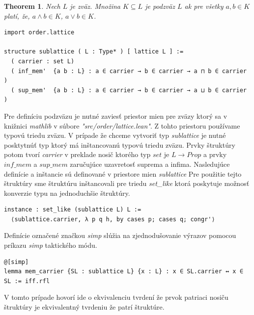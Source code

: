 \documentclass[a4paper,10pt,oneside]{report}%
\newtheorem{theorem}{Theorem}
\begin{document}
\begin{theorem}
    Nech $L$ je zväz. Množina $K \subseteq L$ je \emph{podzväz} $L$ ak pre všetky 
$a,b \in K$ platí, že, $a \wedge b \in K$, $a \vee b \in K$.
\end{theorem}
\begin{lstlisting}
import order.lattice

structure sublattice ( L : Type* ) [ lattice L ] :=
  ( carrier : set L)
  ( inf_mem'  {a b : L} : a ∈ carrier → b ∈ carrier → a ⊓ b ∈ carrier )
  ( sup_mem'  {a b : L} : a ∈ carrier → b ∈ carrier → a ⊔ b ∈ carrier )
\end{lstlisting}
    Pre definíciu podzväzu je nutné zaviesť priestor mien pre zväzy ktorý sa v knižnici
\emph{mathlib} v súbore \emph{"src/order/lattice.lean"}.
    Z tohto priestoru používame typovú triedu zväzu.
    V prípade že chceme vytvoriť typ \emph{sublattice} je nutné posktytnúť
typ ktorý má inštancovanú typovú triedu zväzu.
    Prvky štruktúry potom tvorí \emph{carrier} v preklade nosič ktorého typ
$set$ je $L \to Prop$ a prvky $inf\_mem$ a $sup\_mem$ zaručujúce uzavretosť
    suprema a infima.
    Nasledujúce definície a inštancie sú definované v priestore mien \emph{sublattice}
    Pre použitie tejto štruktúry sme štruktúru inštancovali pre triedu \emph{set\_like}
ktorá poskytuje možnosť konverzie typu na jednoduchšie štruktúry.
\begin{lstlisting}
instance : set_like (sublattice L) L :=
  ⟨sublattice.carrier, λ p q h, by cases p; cases q; congr'⟩
\end{lstlisting}
    Definície označené značkou \emph{simp} slúžia na zjednodušovanie výrazov
pomocou príkazu \emph{simp} taktického módu.
\begin{lstlisting}
@[simp]
lemma mem_carrier {SL : sublattice L} {x : L} : x ∈ SL.carrier ↔ x ∈ SL := iff.rfl
\end{lstlisting}
    V tomto prípade hovorí ide o ekvivalenciu tvrdení že prvok patriaci nosiču
štruktúry je ekvivalentný tvrdeniu že patrí štruktúre.
\end{document}
